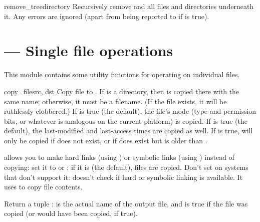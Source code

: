 \documentclass{manual}
\begin{document}
\begin{funcdesc}{remove_tree}{directory}
Recursively remove  and all files and directories underneath
it. Any errors are ignored (apart from being reported to  if 
 is true).
\end{funcdesc}


\section{ --- Single file operations}

This module contains some utility functions for operating on individual files.

\begin{funcdesc}{copy_file}{src, dst}
Copy file  to . If  is a directory, then
 is copied there with the same name; otherwise, it must be a
filename. (If the file exists, it will be ruthlessly clobbered.) If
 is true (the default), the file's mode (type and
permission bits, or whatever is analogous on the current platform) is
copied. If  is true (the default), the last-modified
and last-access times are copied as well. If  is true,
 will only be copied if  does not exist, or if
 does exist but is older than .

 allows you to make hard links (using ) or
symbolic links (using ) instead of copying: set it
to  or ; if it is  (the default),
files are copied. Don't set  on systems that don't support
it:  doesn't check if hard or symbolic linking is
available.  It uses  to copy file contents.

Return a tuple :  is the actual 
name of the output file, and  is true if the file was copied 
(or would have been copied, if  true).
\end{funcdesc}
\end{document}
